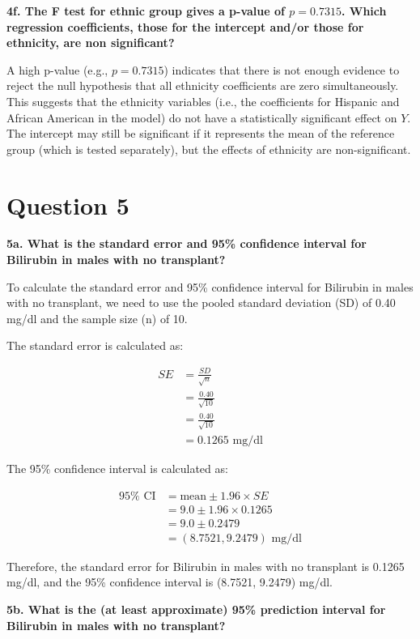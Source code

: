 \documentclass{article}
\begin{document}
\textbf{4f. The F test for ethnic group gives a p-value of \( p = 0.7315 \). Which regression coefficients, those for the intercept and/or those for ethnicity, are non significant?}

A high p-value (e.g., \( p = 0.7315 \)) indicates that there is not enough evidence to reject the null hypothesis that all ethnicity coefficients are zero simultaneously. This suggests that the ethnicity variables (i.e., the coefficients for Hispanic and African American in the model) do not have a statistically significant effect on \( Y \). The intercept may still be significant if it represents the mean of the reference group (which is tested separately), but the effects of ethnicity are non-significant.

\section{Question 5}

\textbf{5a. What is the standard error and 95\% confidence interval for Bilirubin in males with no transplant?}

To calculate the standard error and 95\% confidence interval for Bilirubin in males with no transplant, we need to use the pooled standard deviation (SD) of 0.40 mg/dl and the sample size (n) of 10.

The standard error is calculated as:

\begin{align*}
SE &= \frac{SD}{\sqrt{n}} \\
&= \frac{0.40}{\sqrt{10}} \\
&= \frac{0.40}{\sqrt{10}} \\
&= 0.1265 \text{ mg/dl}
\end{align*}

The 95\% confidence interval is calculated as:

\begin{align*}
95\% \text{ CI} &= \text{mean} \pm 1.96 \times SE \\
&= 9.0 \pm 1.96 \times 0.1265 \\
&= 9.0 \pm 0.2479 \\
&= (8.7521, 9.2479) \text{ mg/dl}
\end{align*}

Therefore, the standard error for Bilirubin in males with no transplant is 0.1265 mg/dl, and the 95\% confidence interval is (8.7521, 9.2479) mg/dl.

\textbf{5b. What is the (at least approximate) 95\% prediction interval for Bilirubin in males with no transplant?}
\end{document}
